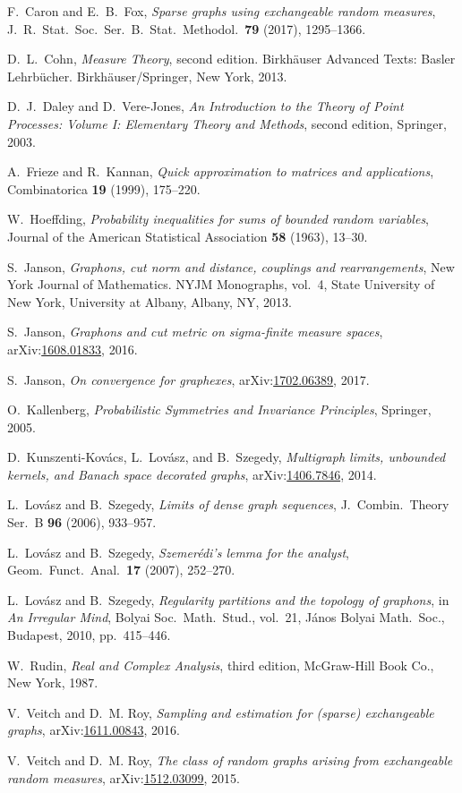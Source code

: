 \documentclass{amsart}
\def\arXiv#1{arXiv:\href{http://arXiv.org/abs/#1}{#1}}
\numberwithin{equation}{section}
\numberwithin{figure}{section}
\theoremstyle{definition}
\theoremstyle{remark}
\begin{document}
\begin{thebibliography}{10}
 F.~Caron and E.~B.~Fox, \emph{Sparse
 graphs using exchangeable random measures}, J.\ R.\ Stat.\
 Soc.\ Ser.\ B.\ Stat.\ Methodol.\ \textbf{79} (2017), 1295--1366.

 D.~L.~Cohn, \emph{Measure Theory}, second edition.
 Birkh\"auser Advanced Texts: Basler Lehrb\"ucher. Birkh\"auser/Springer, New York, 2013.

 D.~J.~Daley and D.~Vere-Jones, \emph{An Introduction to the
 Theory of Point
 Processes: Volume I: Elementary Theory and Methods}, second edition,
 Springer, 2003.

 A.~Frieze and R.~Kannan, \emph{Quick approximation to matrices
 and
 applications}, Combinatorica \textbf{19} (1999), 175--220.

 W.~Hoeffding, \emph{Probability inequalities for sums of
 bounded random
 variables}, Journal of the American Statistical Association \textbf{58}
 (1963), 13--30.

 S.~Janson, \emph{Graphons, cut norm and distance,
 couplings and
 rearrangements}, New York Journal of Mathematics. NYJM Monographs, vol.~4,
 State University of New York, University at Albany, Albany, NY, 2013.

 S.~{Janson}, \emph{Graphons and cut metric on
 sigma-finite measure spaces},
 \arXiv{1608.01833}, 2016.

 S.~Janson, \emph{On convergence for graphexes},
 \arXiv{1702.06389}, 2017.

 O.~Kallenberg, \emph{Probabilistic Symmetries and Invariance
 Principles},
 Springer, 2005.

 D.~{Kunszenti-Kov{\'a}cs}, L.~{Lov{\'a}sz}, and B.~{Szegedy},
 \emph{Multigraph
 limits, unbounded kernels, and Banach space decorated graphs},
 \arXiv{1406.7846}, 2014.

 L.~Lov{\'a}sz and B.~Szegedy, \emph{Limits of dense
 graph sequences}, J.\ Combin.\ Theory Ser.\ B \textbf{96} (2006), 933--957.

 L.~Lov\'asz and B.~Szegedy, \emph{Szemer\'edi's lemma
 for the analyst}, Geom.\ Funct.\ Anal.\ \textbf{17} (2007), 252--270.

 L.~Lov{\'a}sz and B.~Szegedy, \emph{Regularity partitions and
 the topology of
 graphons}, in \emph{An Irregular Mind}, Bolyai Soc.\ Math.\ Stud., vol.~21, J\'anos
 Bolyai Math.\ Soc., Budapest, 2010, pp.~415--446.

 W.~Rudin, \emph{Real and Complex Analysis}, third
    edition, McGraw-Hill Book Co., New York, 1987.

 V.~{Veitch} and D.~M. {Roy}, \emph{Sampling and estimation
 for (sparse) exchangeable graphs}, \arXiv{1611.00843}, 2016.

 V.~Veitch and D.~M. Roy, \emph{The class of random graphs
 arising from
 exchangeable random measures}, \arXiv{1512.03099}, 2015.

\end{thebibliography}
\end{document}
